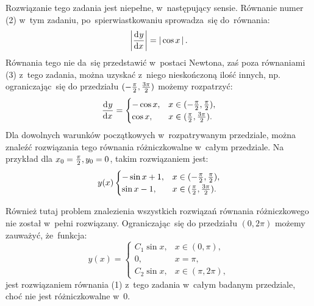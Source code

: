 \documentclass[a4paper,11pt]{article}
\begin{document}
\vspace{\spaceTwo}








\start {}  Rozwiązanie tego zadania jest
niepełne, w~następujący sensie. Równanie numer (2) w~tym zadaniu,
po~spierwiastkowaniu sprowadza~się do~równania:
\begin{equation*}
  \left| \frac{ \mathrm{d}^{  } {  y  } }{ \mathrm{d} {  x  }^{  } } \right| = \left| \,  \cos x  \, \right|.
\end{equation*}
Równania tego nie da~się przedstawić w~postaci Newtona, zaś poza
równaniami (3) z~tego zadania, można uzyskać z~niego nieskończoną
ilość innych, np. ograniczając~się do przedziału
$( -\frac{ \pi }{ 2 }, \frac{ 3 \pi }{ 2 } )$ możemy rozpatrzyć:
\begin{equation*}
  \frac{ \mathrm{d}^{  } {  y  } }{ \mathrm{d} {  x  }^{  } } =
  \begin{cases}
    -\cos x, & x \in ( -\frac{ \pi }{ 2 }, \frac{ \pi }{ 2 } ), \\
    \cos x, & x \in ( \frac{ \pi }{ 2 }, \frac{ 3 \pi }{ 2 } ).
  \end{cases}
\end{equation*}
Dla dowolnych warunków początkowych w~rozpatrywanym przedziale, można
znaleźć rozwiązania tego równania różniczkowalne w~całym przedziale.
Na przykład dla $x_{ 0 } = \frac{ \pi }{ 2 }, y_{ 0 } = 0$, takim
rozwiązaniem jest:
\begin{equation*}
  y( x )
  \begin{cases}
    -\sin x + 1,  & x \in ( -\frac{ \pi }{ 2 }, \frac{ \pi }{ 2 } ), \\
    \sin x - 1, & x \in ( \frac{ \pi }{ 2 }, \frac{ 3 \pi }{ 2 } ).
  \end{cases}
\end{equation*}

\vspace{\spaceFour}


\start {}  Również tutaj problem znalezienia
wszystkich rozwiązań równania różniczkowego nie został w~pełni
rozwiązany. Ograniczając~się do przedziału $( 0, 2 \pi )$ możemy
zauważyć, że~funkcja:
\begin{equation*}
  y( x ) =
  \begin{cases}
    C_{ 1 } \sin x,& x \in ( 0, \pi ), \\
    0, & x = \pi, \\
    C_{ 2 } \sin x,& x \in ( \pi, 2 \pi ),
  \end{cases}
\end{equation*}
jest rozwiązaniem równania (1) z~tego zadania w~całym badanym
przedziale, choć nie jest różniczkowalne w~0.
\end{document}
